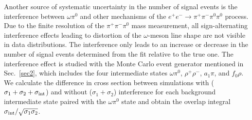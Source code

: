 \documentclass[twocolumn,aps,prd,floatfix,nofootinbib,superscriptaddress]{revtex4-2}
\begin{document}
Another source of systematic uncertainty in the number of signal events is the interference between $\omega\pi^0$ and other mechanisms of the \( e^+e^- \to \pi^+\pi^-\pi^0\pi^0 \) process.
Due to the finite resolution of the $\pi^+\pi^-\pi^0$ mass measurement, all sign-alternating interference effects leading to distortion of the $\omega$-meson line shape are not visible in data distributions.
The interference only leads to an increase or decrease in the number of signal events determined from the fit relative to the true one.
The interference effect is studied with the Monte Carlo event generator mentioned in Sec.~\ref{sec2}, which includes the four intermediate states $\omega\pi^0$, $\rho^+\rho^-$, $a_1\pi$, and $f_0\rho$.
We calculate the difference in cross section between simulations with ($\sigma_1+\sigma_2+\sigma_{\rm int}$) and without ($\sigma_1+\sigma_2$) interference for each background intermediate state paired with the $\omega\pi^0$ state and obtain the overlap integral $\sigma_{\rm int}/\sqrt{\sigma_1\sigma_2}$.
\end{document}
